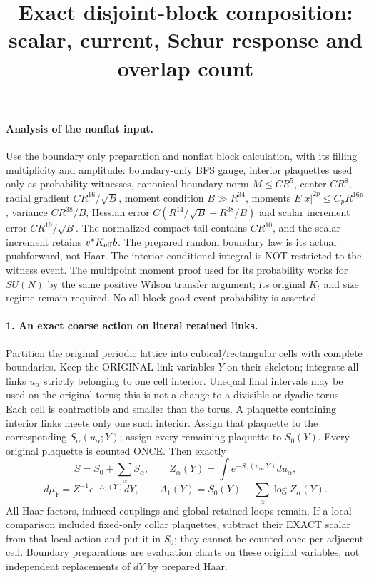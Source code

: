 \documentclass[11pt]{article}
\title{Exact disjoint-block composition: scalar, current, Schur response and overlap count}\author{}\date{}
\begin{document}
\maketitle
\paragraph{Analysis of the nonflat input.}
Use the boundary only preparation and nonflat block calculation, with its filling multiplicity and amplitude:
boundary-only BFS gauge, interior plaquettes used only as probability witnesses,
canonical boundary norm $M\le CR^5$, center $CR^8$, radial gradient
$CR^{16}/\sqrt B$, moment condition $B\gg R^{34}$, moments $E|x|^{2p}\le C_pR^{16p}$,
variance $CR^{38}/B$, Hessian error $C(R^{14}/\sqrt B+R^{38}/B)$ and scalar
increment error $CR^{19}/\sqrt B$. The normalized compact tail contains
$CR^{10}$, and the scalar increment retains $v^*K_{\rm eff}b$.
The prepared random boundary law is its actual pushforward, not Haar. The
interior conditional integral is NOT restricted to the witness event.
The multipoint moment proof used for its probability works for $SU(N)$ by the
same positive Wilson transfer argument; its original $K_t$ and size regime
remain required. No all-block good-event probability is asserted.

\paragraph{1. An exact coarse action on literal retained links.}
Partition the original periodic lattice into cubical/rectangular cells with
complete boundaries. Keep the ORIGINAL link variables $Y$ on their skeleton;
integrate all links $u_\alpha$ strictly belonging to one cell interior.
Unequal final intervals may be used on the original torus; this is not a
change to a divisible or dyadic torus. Each cell is contractible and smaller
than the torus. A plaquette containing interior links meets only one such
interior. Assign that plaquette to the corresponding $S_\alpha(u_\alpha;Y)$;
assign every remaining plaquette to $S_0(Y)$. Every original plaquette is
counted ONCE. Then exactly
\[
 S=S_0+\sum_\alpha S_\alpha,\qquad
 Z_\alpha(Y)=\int e^{-S_\alpha(u_\alpha;Y)}du_\alpha,
\]
\[
 d\mu_Y=Z^{-1}e^{-A_1(Y)}dY,\qquad
 A_1(Y)=S_0(Y)-\sum_\alpha\log Z_\alpha(Y).                             \tag{1}
\]
All Haar factors, induced couplings and global retained loops remain.
If a local comparison included fixed-only collar plaquettes, subtract their
EXACT scalar from that local action and put it in $S_0$; they cannot be counted
once per adjacent cell. Boundary preparations are evaluation charts on these
original variables, not independent replacements of $dY$ by prepared Haar.
\end{document}
